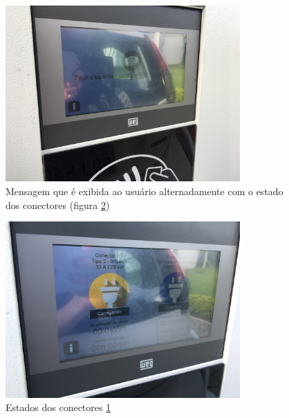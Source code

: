     \begin{figure}[H]
      \begin{center}
        \includegraphics[width=0.8\textwidth,natwidth=1420,natheight=2130]{assets/images/evse-show1.jpg}
        \caption{Mensagem que é exibida ao usuário alternadamente com o estado dos conectores (figura \ref{fig:evse-show2})}
        \label{fig:evse-show1}
      \end{center}
    \end{figure}

    \begin{figure}[H]
      \begin{center}
        \includegraphics[width=0.8\textwidth,natwidth=1420,natheight=2130]{assets/images/evse-show2.jpg}
        \caption{Estados dos conectores \ref{fig:evse-show1}}
        \label{fig:evse-show2}
      \end{center}
    \end{figure}


